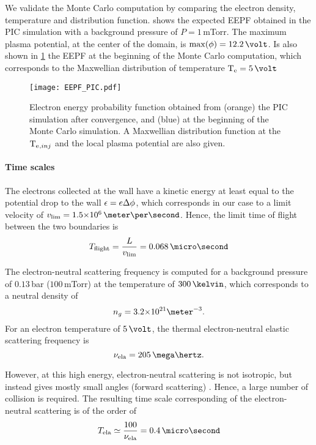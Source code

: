     We validate the Monte Carlo computation by comparing the electron density, temperature and distribution function.
     shows the expected EEPF obtained in the \ac{PIC} simulation with a background pressure of $P=1$\,mTorr.
    The maximum plasma potential, at the center of the domain, is $\max(\phi)=12.2\,\volt$.
    Is also shown in \cref{fig-EEPF_start_end} the EEPF at the beginning of the Monte Carlo computation, which corresponds to the Maxwellian distribution of temperature $\Te=5\,\volt$

    \begin{figure}[hbt]
      \centering
      \texttt{[image: EEPF\_PIC.pdf]}
      \caption{Electron energy probability function obtained from (orange) the PIC simulation after convergence, and (blue) at the beginning of the Monte Carlo simulation. A Maxwellian distribution function at the $\mathrm{T_e}{}_{,inj}$ and the local plasma potential are also given.}
      \label{fig-EEPF_start_end}
    \end{figure}

    \paragraph{Time scales \\}
    The electrons collected at the wall have a kinetic energy at least equal to the potential drop to the wall $\epsilon = e \Delta \phi$, which corresponds in our case to a limit velocity of $v_{\rm lim} = \sn{1.5}{6} \,\meter\per\second$.
    Hence, the limit time of flight between the two boundaries is
    \[ T_{\rm flight} = \frac{L}{v_{\rm lim}} = 0.068 \,\micro\second  \]

    \vspace{1em}
    The electron-neutral scattering frequency is computed for a background pressure of $0.13$\,bar (${100}$\,mTorr) at the temperature of $300\,\kelvin$, which corresponds to a neutral density of $${n_g = \sn{3.2}{21} \meter^{-3}}.$$
    For an electron temperature of $5\,\volt$, the thermal electron-neutral elastic scattering frequency is 
    \[ \nu_{\rm ela} = 205 \,\mega\hertz.  \] 

    However, at this high energy, electron-neutral scattering is not isotropic, but instead gives mostly small angles (forward scattering) \citep{vahedi1995}.
    Hence, a large number of collision is required.
    The resulting time scale corresponding of the electron-neutral scattering is of the order of 
    \[ T_{\rm ela} \simeq \frac{100}{\nu_{\rm ela}} = 0.4 \,\micro\second  \]
    
